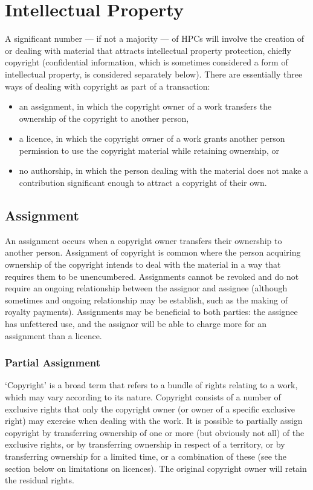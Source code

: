 \documentclass[a4paper,12pt]{article}
\begin{document}
\section{Intellectual Property}

A significant number --- if not a majority --- of HPCs will involve the creation of or dealing with material that attracts intellectual property protection, chiefly copyright (confidential information, which is sometimes considered a form of intellectual property, is considered separately below). There are essentially three ways of dealing with copyright as part of a transaction:

\begin{itemize}
	\item an assignment, in which the copyright owner of a work transfers the ownership of the copyright to another person,
	\item a licence, in which the copyright owner of a work grants another person permission to use the copyright material while retaining ownership, or
	\item no authorship, in which the person dealing with the material does not make a contribution significant enough to attract a copyright of their own.
\end{itemize}

\subsection{Assignment}

An assignment occurs when a copyright owner transfers their ownership to another person. Assignment of copyright is common where the person acquiring ownership of the copyright intends to deal with the material in a way that requires them to be unencumbered. Assignments cannot be revoked and do not require an ongoing relationship between the assignor and assignee (although sometimes and ongoing relationship may be establish, such as the making of royalty payments). Assignments may be beneficial to both parties: the assignee has unfettered use, and the assignor will be able to charge more for an assignment than a licence.

\subsubsection{Partial Assignment}

`Copyright' is a broad term that refers to a bundle of rights relating to a work, which may vary according to its nature. Copyright consists of a number of exclusive rights that only the copyright owner (or owner of a specific exclusive right) may exercise when dealing with the work. It is possible to partially assign copyright by transferring ownership of one or more (but obviously not all) of the exclusive rights, or by transferring ownership in respect of a territory, or by transferring ownership for a limited time, or a combination of these (see the section below on limitations on licences). The original copyright owner will retain the residual rights.
\end{document}
